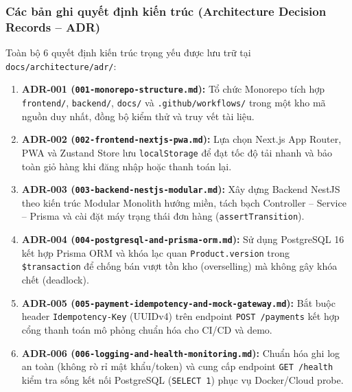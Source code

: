 \documentclass[a4paper,12pt]{article}
\begin{document}
\subsubsection{Các bản ghi quyết định kiến trúc (Architecture Decision Records -- ADR)}
Toàn bộ 6 quyết định kiến trúc trọng yếu được lưu trữ tại \texttt{docs/architecture/adr/}:
\begin{enumerate}[1.]
  \item \textbf{ADR-001 (\texttt{001-monorepo-structure.md}):} Tổ chức Monorepo tích hợp \texttt{frontend/}, \texttt{backend/}, \texttt{docs/} và \texttt{.github/workflows/} trong một kho mã nguồn duy nhất, đồng bộ kiểm thử và truy vết tài liệu.
  \item \textbf{ADR-002 (\texttt{002-frontend-nextjs-pwa.md}):} Lựa chọn Next.js App Router, PWA và Zustand Store lưu \texttt{localStorage} để đạt tốc độ tải nhanh và bảo toàn giỏ hàng khi đăng nhập hoặc thanh toán lại.
  \item \textbf{ADR-003 (\texttt{003-backend-nestjs-modular.md}):} Xây dựng Backend NestJS theo kiến trúc Modular Monolith hướng miền, tách bạch Controller -- Service -- Prisma và cài đặt máy trạng thái đơn hàng (\texttt{assertTransition}).
  \item \textbf{ADR-004 (\texttt{004-postgresql-and-prisma-orm.md}):} Sử dụng PostgreSQL 16 kết hợp Prisma ORM và khóa lạc quan \texttt{Product.version} trong \texttt{\$transaction} để chống bán vượt tồn kho (overselling) mà không gây khóa chết (deadlock).
  \item \textbf{ADR-005 (\texttt{005-payment-idempotency-and-mock-gateway.md}):} Bắt buộc header \texttt{Idempotency-Key} (UUIDv4) trên endpoint \texttt{POST /payments} kết hợp cổng thanh toán mô phỏng chuẩn hóa cho CI/CD và demo.
  \item \textbf{ADR-006 (\texttt{006-logging-and-health-monitoring.md}):} Chuẩn hóa ghi log an toàn (không rò rỉ mật khẩu/token) và cung cấp endpoint \texttt{GET /health} kiểm tra sống kết nối PostgreSQL (\texttt{SELECT 1}) phục vụ Docker/Cloud probe.
\end{enumerate}

\newpage
\end{document}
